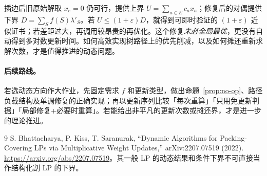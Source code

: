 \documentclass[UTF8,10pt,a4paper]{ctexart}
\begin{document}
插边后旧原始解取 $x_e=0$ 仍可行，提供上界 $U=\sum_{a\in E}c_ax_a$；修复后的对偶提供下界 $D=\sum_S f(S)\lambda'_S$。若 $U\le(1+\varepsilon)D$，就得到可即时验证的 $(1+\varepsilon)$ 近似证书；若差距过大，再调用较昂贵的再优化。这个修复\emph{未必全局最优}，更没有自动得到多对数更新时间。如何高效实现树路径上的优先削减，以及如何摊还重新求解次数，才是值得推进的动态问题。

\paragraph{后续路线。}若选动态方向作大作业，先固定需求 $f$ 和更新类型，做出命题~\ref{prop:no-op}、路径负载结构及单调修复的正确实现；再以更新序列比较「每次重算」「只用免更新判据」「局部修复+必要时重算」。若能给出非平凡的更新次数或摊还界，才是进一步的理论推进。

\begin{thebibliography}{9}
 S. Bhattacharya, P. Kiss, T. Saranurak, ``Dynamic Algorithms for Packing-Covering LPs via Multiplicative Weight Updates,'' arXiv:2207.07519 (2022). \url{https://arxiv.org/abs/2207.07519}。其一般 LP 的动态结果和条件下界不可直接当作结构化割 LP 的下界。
\end{thebibliography}
\end{document}
